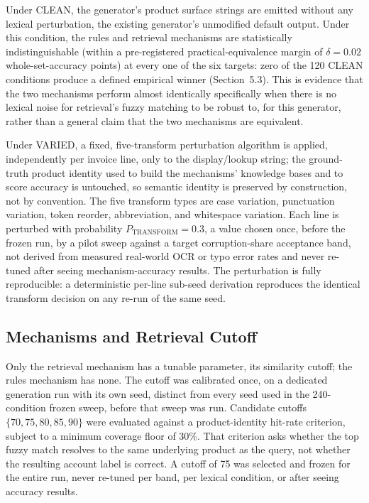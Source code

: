 \documentclass[11pt]{article}
\begin{document}
Under CLEAN, the generator's product surface strings are emitted without any
lexical perturbation, the existing generator's unmodified default output.
Under this condition, the rules and retrieval mechanisms are statistically
indistinguishable (within a pre-registered practical-equivalence margin of
$\delta=0.02$ whole-set-accuracy points) at every one of the six targets:
zero of the 120 CLEAN conditions produce a defined empirical winner
(Section~5.3). This is evidence that the two mechanisms perform almost
identically specifically when there is no lexical noise for retrieval's
fuzzy matching to be robust to, for this generator, rather than a general claim
that the two mechanisms are equivalent.

Under VARIED, a fixed, five-transform perturbation algorithm is applied,
independently per invoice line, only to the display/lookup string; the
ground-truth product identity used to build the mechanisms' knowledge bases
and to score accuracy is untouched, so semantic identity is preserved by
construction, not by convention. The five transform types are case
variation, punctuation variation, token reorder, abbreviation, and whitespace
variation. Each line is perturbed with probability
$P_{\mathrm{TRANSFORM}}=0.3$, a value chosen once, before the frozen run, by
a pilot sweep against a target corruption-share acceptance band, not derived
from measured real-world OCR or typo error rates and never re-tuned after
seeing mechanism-accuracy results. The perturbation is fully reproducible: a
deterministic per-line sub-seed derivation reproduces the identical transform
decision on any re-run of the same seed.

\subsection{Mechanisms and Retrieval Cutoff}
\label{sec:retrieval-cutoff}

Only the retrieval mechanism has a tunable parameter, its similarity cutoff;
the rules mechanism has none. The cutoff was calibrated once, on a dedicated
generation run with its own seed, distinct from every seed used in the
240-condition frozen sweep, before that sweep was run. Candidate cutoffs
$\{70,75,80,85,90\}$ were evaluated against a product-identity hit-rate
criterion, subject to a minimum coverage floor of 30\%. That criterion asks
whether the top fuzzy match resolves to the same underlying product as the
query, not whether the resulting account label is correct. A cutoff of 75 was
selected and frozen for the entire run, never re-tuned per band, per lexical
condition, or
after seeing accuracy results.
\end{document}
